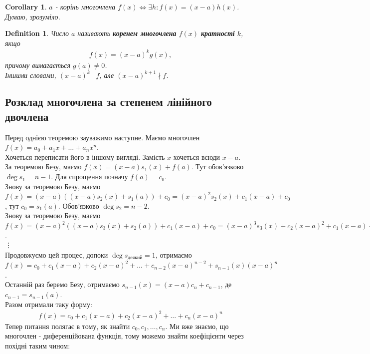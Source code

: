 \documentclass[a4paper, 10pt]{extarticle}
\theoremstyle{theoremdd}
\theoremstyle{theoremdd}
\newtheorem{definition}[theorem]{Definition}
\theoremstyle{theoremdd}
\theoremstyle{theoremdd}
\theoremstyle{theoremdd}
\theoremstyle{theoremdd}
\theoremstyle{theoremdd}
\theoremstyle{theoremdd}
\newtheorem{corollary}[theorem]{Corollary}
\begin{document}
\begin{corollary}
$a$ - корінь многочлена $f(x) \iff \exists h: f(x) = (x-a)h(x)$.\\
\textit{Думаю, зрозуміло.}
\end{corollary}

\begin{definition}
Число $a$ називають \textbf{коренем многочлена} $f(x)$ \textbf{кратності} $k$, якщо 
\begin{align*}
f(x) = (x-a)^k g(x),
\end{align*}
причому вимагається $g(a) \neq 0$.\\
Іншими словами, $(x-a)^k \mid f$, але $(x-a)^{k+1} \nmid f$.
\end{definition}

\subsection*{Розклад многочлена за степенем лінійного двочлена}
Перед однією теоремою зауважимо наступне. Маємо многочлен\\
$f(x) = a_0 + a_1 x + \dots + a_n x^n$.\\
Хочеться переписати його в іншому вигляді. Замість $x$ хочеться всюди $x-a$.\\
За теоремою Безу, маємо $f(x) = (x-a)s_1(x) + f(a)$. Тут обов'язково $\deg s_1 = n-1$. Для спрощення позначу $f(a) = c_0$.\\
Знову за теоремою Безу, маємо $f(x) = (x-a)((x-a)s_2(x) + s_1(a)) + c_0 = (x-a)^2 s_2(x) + c_1 (x-a) + c_0$, тут $c_0 = s_1(a)$. Обов'язково $\deg s_2 = n-2$.\\
Знову за теоремою Безу, маємо $f(x) = (x-a)^2 ((x-a)s_3(x) + s_2(a)) + c_1(x-a) + c_0 = (x-a)^3 s_3(x) + c_2 (x-a)^2 + c_1(x-a) + c_0$.\\
\vdots \\
Продовжуємо цей процес, допоки $\deg s_{\text{деякий}} = 1$, отримаємо\\
$f(x) = c_0 + c_1 (x-a) + c_2 (x-a)^2 + \dots + c_{n-2}(x-a)^{n-2} + s_{n-1}(x) (x-a)^n$.\\
Останній раз беремо Безу, отримаємо $s_{n-1}(x) = (x-a) c_n + c_{n-1}$, де $c_{n-1} = s_{n-1}(a)$.\\
Разом отримали таку форму:
\begin{align*}
f(x) = c_0 + c_1(x-a) + c_2(x-a)^2 + \dots + c_n(x-a)^n
\end{align*}
Тепер питання полягає в тому, як знайти $c_0,c_1,\dots,c_n$. Ми вже знаємо, що многочлен - диференційована функція, тому можемо знайти коефіцієнти через похідні таким чином:\\
\end{document}
